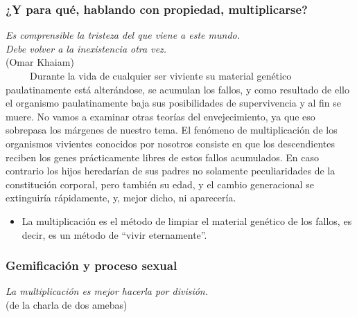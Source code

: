 \protect\hypertarget{M1A}{}{}

\subsubsection{¿Y para qué, hablando con propiedad, multiplicarse?}
\label{y-para-quuxe9-hablando-con-propiedad-multiplicarse}

\noindent 
\textit{Es comprensible la tristeza del que viene a este mundo.}\\
\textit{Debe volver a la inexistencia otra vez.}\\
(Omar Khaiam)\\

~ ~ ~ Durante la vida de cualquier ser viviente su material genético
paulatinamente está alterándose, se acumulan los fallos, y como
resultado de ello el organismo paulatinamente baja sus posibilidades de
supervivencia y al fin se muere. No vamos a examinar otras teorías del
envejecimiento, ya que eso sobrepasa los márgenes de nuestro tema. El
fenómeno de multiplicación de los organismos vivientes conocidos por
nosotros consiste en que los descendientes reciben los genes
prácticamente libres de estos fallos acumulados. En caso contrario los
hijos heredarían de sus padres no solamente peculiaridades de la
constitución corporal, pero también su edad, y el cambio generacional se
extinguiría rápidamente, y, mejor dicho, ni aparecería.

\begin{itemize}
% 
\item
  La multiplicación es el método de limpiar el material genético de los
  fallos, es decir, es un método de ``vivir eternamente''.
\end{itemize}

\protect\hypertarget{M2}{}{}

\subsubsection{Gemificación y proceso sexual}\label{gemificaciuxf3n-y-proceso-sexual}

\noindent
\textit{La multiplicación es mejor hacerla por división.}\\
(de la charla de dos amebas)\\

